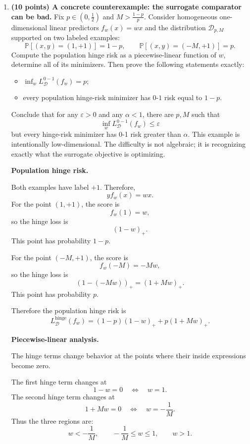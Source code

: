 \documentclass[11pt]{article}
\newcommand{\eps}{\varepsilon}
\begin{document}
\begin{enumerate}
    \item \textbf{(10 points) A concrete counterexample: the surrogate comparator can be bad.}
    \newline
    Fix $p\in(0,\tfrac{1}{2})$ and $M>\tfrac{1-p}{p}$. Consider homogeneous one-dimensional linear
    predictors $f_w(x)=wx$ and the distribution $\mathcal{D}_{p,M}$ supported on two labeled examples:
    \[
    \mathbb{P}[(x,y)=(1,+1)] = 1-p,
    \qquad
    \mathbb{P}[(x,y)=(-M,+1)] = p.
    \]
    Compute the population hinge risk as a piecewise-linear function of $w$, determine all of its minimizers. Then prove the following statements exactly:
    \begin{itemize}
        \item $\inf_w L_\mathcal{D}^{0-1}(f_w)=p$;
        \item every population hinge-risk minimizer has $0$-$1$ risk equal to $1-p$.
    \end{itemize}
    Conclude that for any $\eps>0$ and any $\alpha<1$, there are $p,M$ such that
    \[
    \inf_{w} L_{\mathcal{D}}^{0-1}(f_w)\le \eps
    \]
    but every hinge-risk minimizer has 0-1 risk greater than $\alpha$.
    \newline
    This example is intentionally low-dimensional. The difficulty is not algebraic; it is recognizing exactly what the surrogate objective is optimizing.

    \begin{solutionbox}

    \textbf{Population hinge risk.}

    Both examples have label $+1$. Therefore,
    \[
    yf_w(x)=wx.
    \]
    For the point $(1,+1)$, the score is
    \[
    f_w(1)=w,
    \]
    so the hinge loss is
    \[
    (1-w)_+.
    \]
    This point has probability $1-p$.

    For the point $(-M,+1)$, the score is
    \[
    f_w(-M)=-Mw,
    \]
    so the hinge loss is
    \[
    (1-(-Mw))_+=(1+Mw)_+.
    \]
    This point has probability $p$.

    Therefore the population hinge risk is
    \[
    L_{\mathcal D}^{\mathrm{hinge}}(f_w)
    =
    (1-p)(1-w)_+
    +
    p(1+Mw)_+.
    \]

    \medskip

    \textbf{Piecewise-linear analysis.}

    The hinge terms change behavior at the points where their inside expressions become zero.

    The first hinge term changes at
    \[
    1-w=0
    \quad\Longleftrightarrow\quad
    w=1.
    \]
    The second hinge term changes at
    \[
    1+Mw=0
    \quad\Longleftrightarrow\quad
    w=-\frac1M.
    \]
    Thus the three regions are:
    \[
    w<-\frac1M,\qquad
    -\frac1M\le w\le1,\qquad
    w>1.
    \]


\end{solutionbox}
\end{enumerate}
\end{document}
